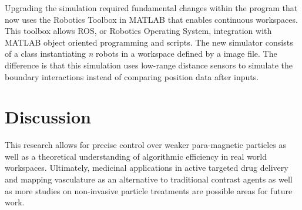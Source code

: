 \documentclass[letterpaper, 9 pt, conference]{ieeeconf}  %
\begin{document}
	Upgrading the simulation required fundamental changes within the program that now uses the Robotics Toolbox in MATLAB that enables continuous workspaces. This toolbox allows ROS, or Robotics Operating System, integration with MATLAB object oriented programming and scripts. The new simulator consists of a class instantiating \textit{n} robots in a workspace defined by a image file. The difference is that this simulation uses low-range distance sensors to simulate the boundary interactions instead of comparing position data after inputs. 
\section{Discussion}\label{sec:Discussion}
	This research allows for precise control over weaker para-magnetic particles as well as a theoretical understanding of algorithmic efficiency in real world workspaces. Ultimately, medicinal applications in active targeted drug delivery and mapping vasculature as an alternative to traditional contrast agents as well as more studies on non-invasive particle treatments are possible areas for future work. 
\end{document}
